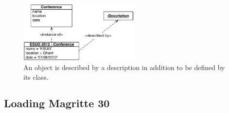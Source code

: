 \documentclass[a4paper,10pt,twoside]{book}
\begin{document}
\begin{figure}[ht!]
\begin{center}
\includegraphics[width=6cm]{basicPrinciple2}
\caption{An object is described by a description in addition to be defined by its class.\label{fig:mabasicPrinciple}}
\end{center}
\end{figure}

\subsection{Loading Magritte 30}

\ifx\wholebook\relax\else
    
\end{document}
